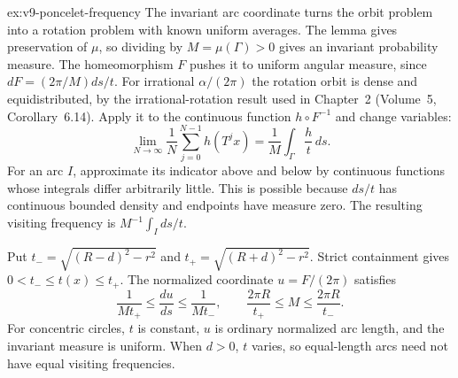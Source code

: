 \begin{solution}{ex:v9-poncelet-frequency}
\idea The invariant arc coordinate turns the orbit problem into a rotation problem with known uniform averages.
\writeup The lemma gives preservation of $\mu$, so dividing by $M=\mu(\Gamma)>0$ gives an invariant probability measure. The homeomorphism $F$ pushes it to uniform angular measure, since $dF=(2\pi/M)ds/t$. For irrational $\alpha/(2\pi)$ the rotation orbit is dense and equidistributed, by the irrational-rotation result used in Chapter~2 (Volume~5, Corollary~6.14). Apply it to the continuous function $h\circ F^{-1}$ and change variables:
\[
\lim_{N\to\infty}\frac1N\sum_{j=0}^{N-1}h(T^jx)
=\frac1M\int_\Gamma\frac{h}{t}\,ds.
\]
For an arc $I$, approximate its indicator above and below by continuous functions whose integrals differ arbitrarily little. This is possible because $ds/t$ has continuous bounded density and endpoints have measure zero. The resulting visiting frequency is $M^{-1}\int_I ds/t$.

Put $t_- =\sqrt{(R-d)^2-r^2}$ and $t_+=\sqrt{(R+d)^2-r^2}$. Strict containment gives $0<t_-\le t(x)\le t_+$. The normalized coordinate $u=F/(2\pi)$ satisfies
\[
\frac1{Mt_+}\le\frac{du}{ds}\le\frac1{Mt_-},\qquad
\frac{2\pi R}{t_+}\le M\le\frac{2\pi R}{t_-}.
\]
For concentric circles, $t$ is constant, $u$ is ordinary normalized arc length, and the invariant measure is uniform. When $d>0$, $t$ varies, so equal-length arcs need not have equal visiting frequencies.
\end{solution}
